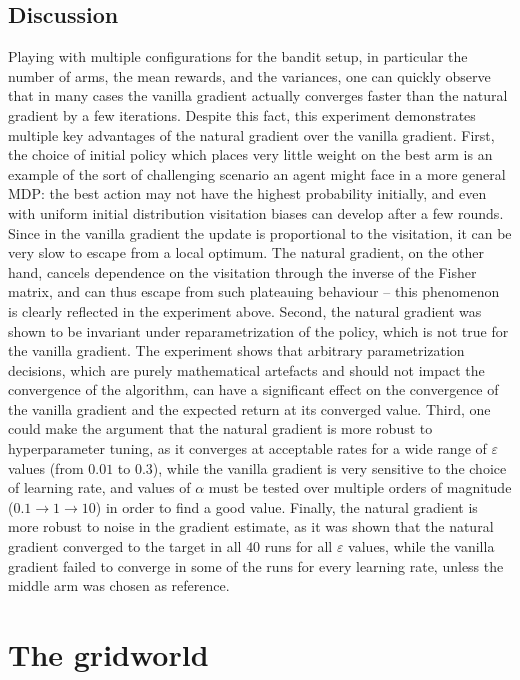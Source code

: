 \documentclass[11pt,a4paper]{article}
\numberwithin{equation}{section}
\theoremstyle{plain}
\theoremstyle{definition}
\theoremstyle{remark}
\begin{document}
\subsection{Discussion}\label{sec:bandit-discussion}
Playing with multiple configurations for the bandit setup, in particular the number of arms, the mean rewards, and the variances, one can quickly observe that in many cases the vanilla gradient actually converges faster than the natural gradient by a few iterations. Despite this fact, this experiment demonstrates multiple key advantages of the natural gradient over the vanilla gradient. First, the choice of initial policy which places very little weight on the best arm is an example of the sort of challenging scenario an agent might face in a more general MDP: the best action may not have the highest probability initially, and even with uniform initial distribution visitation biases can develop after a few rounds.
Since in the vanilla gradient the update is proportional to the visitation, it can be very slow to escape from a local optimum. The natural gradient, on the other hand, cancels dependence on the visitation through the inverse of the Fisher matrix, and can thus escape from such plateauing behaviour -- this phenomenon is clearly reflected in the experiment above. 
Second, the natural gradient was shown to be invariant under reparametrization of the policy, which is not true for the vanilla gradient. The experiment shows that arbitrary parametrization decisions, which are purely mathematical artefacts and should not impact the convergence of the algorithm, can have a significant effect on the convergence of the vanilla gradient and the expected return at its converged value. 
Third, one could make the argument that the natural gradient is more robust to hyperparameter tuning, as it converges at acceptable rates for a wide range of $\varepsilon$ values (from $0.01$ to $0.3$), while the vanilla gradient is very sensitive to the choice of learning rate, and values of $\alpha$ must be tested over multiple orders of magnitude ($0.1\to1\to10$) in order to find a good value. 
Finally, the natural gradient is more robust to noise in the gradient estimate, as it was shown that the natural gradient converged to the target in all $40$ runs for all $\varepsilon$ values, while the vanilla gradient failed to converge in some of the runs for every learning rate, unless the middle arm was chosen as reference.

\FloatBarrier
\section{The gridworld}\label{sec:grid}
\end{document}
